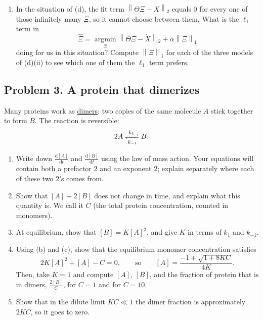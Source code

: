\documentclass[a4paper,12pt]{article}
\begin{document}
\begin{enumerate}[label=(\alph*)]
\begin{enumerate}[label=(\roman*)]
\end{enumerate}

\item In the situation of (d), the fit term $\left\| \Theta\Xi-\dot{X} \right\|_2$ equals $0$ for every one of those infinitely many $\Xi$, so it cannot choose between them. What is the $\ell_1$ term in
\[ \hat{\Xi} = \underset{\Xi}{\operatorname{argmin}} \left\| \Theta \Xi - \dot{X} \right\|_2 + \alpha \left\| \Xi \right\|_1 \]
doing for us in this situation? Compute $\left\| \Xi \right\|_1$ for each of the three models of (d)(ii) to see which one of them the $\ell_1$ term prefers.

\end{enumerate}

\subsection*{Problem 3. A protein that dimerizes}

Many proteins work as \underline{dimers}: two copies of the same molecule $A$ stick together to form $B$. The reaction is reversible:
\[ 2A \xrightleftharpoons[k_{-1}]{k_1} B . \]

\begin{enumerate}[label=(\alph*)]
\item Write down $\frac{\text{d}[A]}{\text{d}t}$ and $\frac{\text{d}[B]}{\text{d}t}$ using the law of mass action. Your equations will contain both a prefactor $2$ and an exponent $2$; explain separately where each of these two $2$'s comes from.

\item Show that $[A] + 2[B]$ does not change in time, and explain what this quantity is. We call it $C$ (the total protein concentration, counted in monomers).

\item At equilibrium, show that $[B] = K [A]^2$, and give $K$ in terms of $k_1$ and $k_{-1}$.

\item Using (b) and (c), show that the equilibrium monomer concentration satisfies
\[ 2K[A]^2 + [A] - C = 0,
\qquad\text{so}\qquad
[A] = \frac{-1+\sqrt{1+8KC}}{4K} . \]
Then, take $K=1$ and compute $[A]$, $[B]$, and the fraction of protein that is in dimers, $\frac{2[B]}{C}$, for $C=1$ and for $C=10$.

\item Show that in the dilute limit $KC \ll 1$ the dimer fraction is approximately $2KC$, so it goes to zero.
\end{enumerate}
\end{document}
